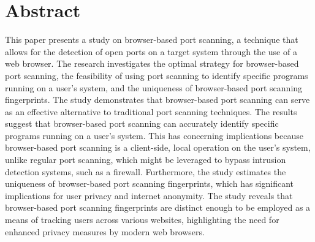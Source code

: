 \chapter*{Abstract}

This paper presents a study on browser-based port scanning, a technique that allows for the detection of open ports on a target system through the use of a web browser. The research investigates the optimal strategy for browser-based port scanning, the feasibility of using port scanning to identify specific programs running on a user's system, and the uniqueness of browser-based port scanning fingerprints.
The study demonstrates that browser-based port scanning can serve as an effective alternative to traditional port scanning techniques. The results suggest that browser-based port scanning can accurately identify specific programs running on a user's system. This has concerning implications because browser-based port scanning is a client-side, local operation on the user's system, unlike regular port scanning, which might be leveraged to bypass intrusion detection systems, such as a firewall.
Furthermore, the study estimates the uniqueness of browser-based port scanning fingerprints, which has significant implications for user privacy and internet anonymity. The study reveals that browser-based port scanning fingerprints are distinct enough to be employed as a means of tracking users across various websites, highlighting the need for enhanced privacy measures by modern web browsers.  